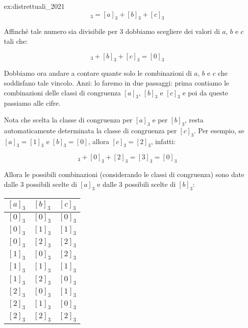 \begin{soluzione}{ex:distrettuali_2021}
    \begin{equation*}
        [a + b + c]_3 = [a]_3 + [b]_3 + [c]_3
    \end{equation*}

    Affinché tale numero sia divisibile per 3 dobbiamo scegliere dei valori di $a$, $b$ e $c$ tali che:

    \begin{equation*}
        [a]_3 + [b]_3 + [c]_3 = [0]_3
    \end{equation*}

    Dobbiamo ora andare a contare quante solo le combinazioni di $a$, $b$ e $c$ che soddisfano tale vincolo.
    Anzi: lo
    faremo in due passaggi: prima contiamo le combinazioni delle classi di congruenza $[a]_3$, $[b]_3$ e $[c]_3$ e poi
    da queste passiamo alle cifre.

    Nota che scelta la classe di congruenza per $[a]_3$ e per $[b]_3$, resta automaticamente determinata la classe di
    congruenza per $[c]_3$.
    Per esempio, se $[a]_3 = [1]_3$ e $[b]_3 = [0]$, allora $[c]_3 =  [2]_3$, infatti:

    \begin{equation*}
        [1]_3 + [0]_3 + [2]_3 = [3]_3 = [0]_3
    \end{equation*}

    Allora le possibili combinazioni (considerando le classi di congruenza) sono date dalle 3 possibili scelte di $[a]_3$
    e dalle 3 possibili scelte di $[b]_3$:

    \begin{table}[H]
        \label{tab:distrettuali_2019_1}
        \centering
        \begin{tabular}{ccc}
            \toprule
            $[a]_3$ & $[b]_3$ & $[c]_3$ \\
            \midrule
            $[0]_3$ & $[0]_3$ & $[0]_3$ \\
            $[0]_3$ & $[1]_3$ & $[1]_3$ \\
            $[0]_3$ & $[2]_3$ & $[2]_3$ \\
            $[1]_3$ & $[0]_3$ & $[2]_3$ \\
            $[1]_3$ & $[1]_3$ & $[1]_3$ \\
            $[1]_3$ & $[2]_3$ & $[0]_3$ \\
            $[2]_3$ & $[0]_3$ & $[1]_3$ \\
            $[2]_3$ & $[1]_3$ & $[0]_3$ \\
            $[2]_3$ & $[2]_3$ & $[2]_3$ \\
            \bottomrule
        \end{tabular}
    \end{table}


\end{soluzione}
